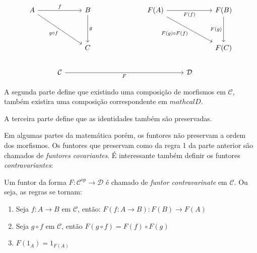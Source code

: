 \documentclass[../main.tex]{subfiles}
\begin{document}
\[\begin{tikzcd}
	A && B &&& {F(A)} && {F(B)} \\
	\\
	&& C &&&&& {F(C)} \\
	& {\mathcal{C}} &&&&& {\mathcal{D}}
	\arrow["f", from=1-1, to=1-3]
	\arrow["{g \circ f}"', from=1-1, to=3-3]
	\arrow["g", from=1-3, to=3-3]
	\arrow["{F(f)}"', from=1-6, to=1-8]
	\arrow["{F(g) \circ F(f)}"', from=1-6, to=3-8]
	\arrow["{F(g)}"', from=1-8, to=3-8]
	\arrow["F"', from=4-2, to=4-7]
\end{tikzcd}\]

A segunda parte define que existindo uma composição de morfismos em $\mathcal{C}$, também existira uma composição correspondente em $mathcal{D}$.

A terceira parte define que as identidades também são preservadas.

Em algumas partes da matemática porém, os funtores não preservam a ordem dos morfismos. Os funtores que preservam como da regra 1 da parte anterior são chamados de \emph{funtores covariantes}. É interessante também definir os funtores \emph{contravariantes}:

\begin{definition}
    Um funtor da forma $F : \mathcal{C}^{op} \to \mathcal{D}$ é chamado de \emph{funtor contravarinate} em $\mathcal{C}$. Ou seja, as regras se tornam:
    \begin{enumerate}
        \item Seja $f : A \to B$ em $\mathcal{C}$, então: $F(f : A \to B) : F(B) \to F(A)$
        \item Seja $g \circ f$ em $\mathcal{C}$, então $F(g \circ f) = F(f) \circ F(g)$
        \item $F(1_A) = 1_{F(A)}$
    \end{enumerate}  
\end{definition}
\end{document}
